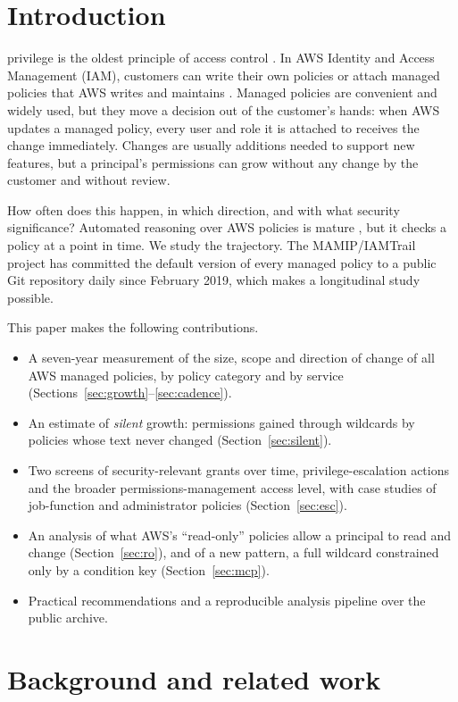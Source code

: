 \documentclass[journal]{IEEEtran}
\begin{document}
\section{Introduction}
 privilege is the oldest principle of access control \cite{saltzer1975}. In AWS Identity and Access Management
(IAM), customers can write their own policies or attach managed policies that AWS writes and maintains \cite{awsmanaged}. Managed
policies are convenient and widely used, but they move a decision out of the customer's hands: when AWS updates a managed policy,
every user and role it is attached to receives the change immediately. Changes are usually additions needed to support new features,
but a principal's permissions can grow without any change by the customer and without review.

How often does this happen, in which direction, and with what security significance? Automated reasoning over AWS policies is mature
\cite{backes2018zelkova,bouchet2020blockpublic}, but it checks a policy at a point in time. We study the trajectory. The MAMIP/IAMTrail
project \cite{mamip} has committed the default version of every managed policy to a public Git repository daily since February 2019,
which makes a longitudinal study possible.

This paper makes the following contributions.
\begin{itemize}
\item A seven-year measurement of the size, scope and direction of change of all AWS managed policies, by policy category and by
service (Sections~\ref{sec:growth}--\ref{sec:cadence}).
\item An estimate of \emph{silent} growth: permissions gained through wildcards by policies whose text never changed
(Section~\ref{sec:silent}).
\item Two screens of security-relevant grants over time, privilege-escalation actions and the broader permissions-management access
level, with case studies of job-function and administrator policies (Section~\ref{sec:esc}).
\item An analysis of what AWS's ``read-only'' policies allow a principal to read and change (Section~\ref{sec:ro}), and of a new
pattern, a full wildcard constrained only by a condition key (Section~\ref{sec:mcp}).
\item Practical recommendations and a reproducible analysis pipeline over the public archive.
\end{itemize}

\section{Background and related work}
\end{document}
